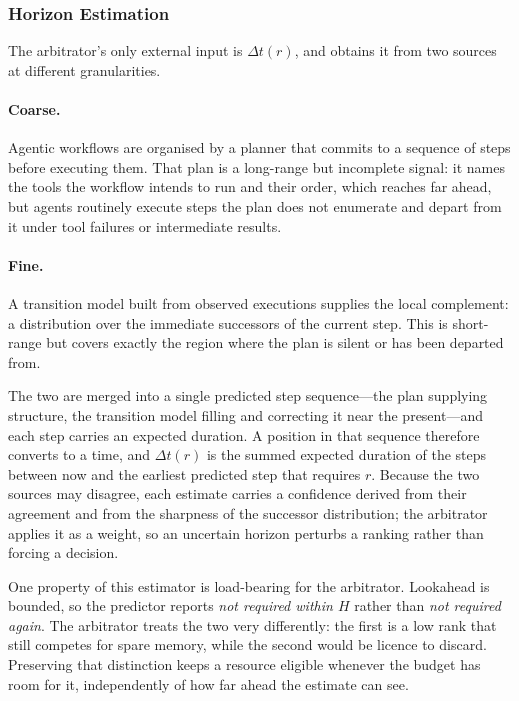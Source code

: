 \subsubsection{Horizon Estimation}
\label{sec:horizon}

The arbitrator's only external input is $\Delta t(r)$, and \sysname obtains it
from two sources at different granularities.

\paragraph{Coarse.}
Agentic workflows are organised by a planner that commits to a sequence of
steps before executing them. That plan is a long-range but incomplete signal:
it names the tools the workflow intends to run and their order, which reaches
far ahead, but agents routinely execute steps the plan does not enumerate and
depart from it under tool failures or intermediate results.

\paragraph{Fine.}
A transition model built from observed executions supplies the local
complement: a distribution over the immediate successors of the current step.
This is short-range but covers exactly the region where the plan is silent or
has been departed from.

The two are merged into a single predicted step sequence---the plan supplying
structure, the transition model filling and correcting it near the
present---and each step carries an expected duration. A position in that
sequence therefore converts to a time, and $\Delta t(r)$ is the summed
expected duration of the steps between now and the earliest predicted step
that requires $r$. Because the two sources may disagree, each estimate carries
a confidence derived from their agreement and from the sharpness of the
successor distribution; the arbitrator applies it as a weight, so an uncertain
horizon perturbs a ranking rather than forcing a decision.

One property of this estimator is load-bearing for the arbitrator. Lookahead
is bounded, so the predictor reports \emph{not required within $H$} rather
than \emph{not required again}. The arbitrator treats the two very
differently: the first is a low rank that still competes for spare memory,
while the second would be licence to discard. Preserving that distinction
keeps a resource eligible whenever the budget has room for it, independently
of how far ahead the estimate can see.

